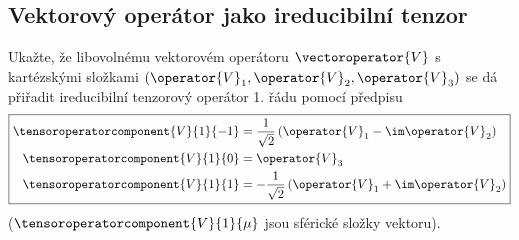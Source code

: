 \subsection{Vektorový operátor jako ireducibilní tenzor}
Ukažte, že libovolnému vektorovém operátoru $\vectoroperator{V}$ s kartézskými složkami $(\operator{V}_{1},\operator{V}_{2},\operator{V}_{3})$ se dá přiřadit ireducibilní tenzorový operátor 1. řádu pomocí předpisu
\begin{equation}\label{eq:VectorTensor}
    \boxed{
        \begin{aligned}
            \tensoroperatorcomponent{V}{1}{-1}
                &=\frac{1}{\sqrt{2}}\left(\operator{V}_{1}-\im\operator{V}_{2}\right)\\
            \tensoroperatorcomponent{V}{1}{0}
                &=\operator{V}_{3}\\
            \tensoroperatorcomponent{V}{1}{1}
                &=-\frac{1}{\sqrt{2}}\left(\operator{V}_{1}+\im\operator{V}_{2}\right)
        \end{aligned}
    }
\end{equation}
($\tensoroperatorcomponent{V}{1}{\mu}$ jsou sférické složky vektoru).

